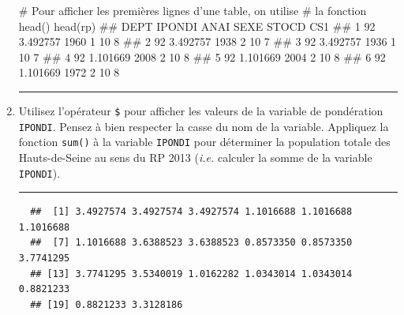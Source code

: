 \documentclass[12pt,twosided, notitlepage]{book}
\newenvironment{Shaded}{}{}
\newcommand{\KeywordTok}[1]{\textcolor[rgb]{0.00,0.00,1.00}{{#1}}}
\newcommand{\CommentTok}[1]{\textcolor[rgb]{0.00,0.50,0.00}{{#1}}}
\newcommand{\NormalTok}[1]{{#1}}
\newif \ifsol
\renewenvironment{Shaded}{\begin{snugshade}}{\end{snugshade}}
\begin{document}
\begin{enumerate}
\begin{Shaded}
\begin{Highlighting}[]
\CommentTok{# Pour afficher les premières lignes d'une table, on utilise}
\CommentTok{# la fonction head()}
\KeywordTok{head}\NormalTok{(rp)}
  \NormalTok{##   DEPT   IPONDI ANAI SEXE STOCD CS1}
  \NormalTok{## 1   92 3.492757 1960    1    10   8}
  \NormalTok{## 2   92 3.492757 1938    2    10   7}
  \NormalTok{## 3   92 3.492757 1936    1    10   7}
  \NormalTok{## 4   92 1.101669 2008    2    10   8}
  \NormalTok{## 5   92 1.101669 2004    2    10   8}
  \NormalTok{## 6   92 1.101669 1972    2    10   8}
\end{Highlighting}
\end{Shaded}

  \begin{center} \rule{0.5\linewidth}{\linethickness}\end{center}

  \bigskip  \fi 
\item
  Utilisez l'opérateur \texttt{\$}\index{\texttt{\$}} pour afficher les
  valeurs de la variable de pondération \texttt{IPONDI}. Pensez à bien
  respecter la casse du nom de la variable. Appliquez la fonction
  \texttt{sum()} à la variable \texttt{IPONDI} pour
  déterminer la population totale des Hauts-de-Seine au sens du RP 2013
  (\emph{i.e.} calculer la somme de la variable \texttt{IPONDI}).

  \ifsol 

  \begin{center} \rule{0.5\linewidth}{\linethickness}\end{center}

\begin{Shaded}
\end{Shaded}

\begin{verbatim}
  ##  [1] 3.4927574 3.4927574 3.4927574 1.1016688 1.1016688 1.1016688
  ##  [7] 1.1016688 3.6388523 3.6388523 0.8573350 0.8573350 3.7741295
  ## [13] 3.7741295 3.5340019 1.0162282 1.0343014 1.0343014 0.8821233
  ## [19] 0.8821233 3.3128186
\end{verbatim}

\begin{Shaded}
\end{Shaded}


\end{enumerate}
\end{document}
